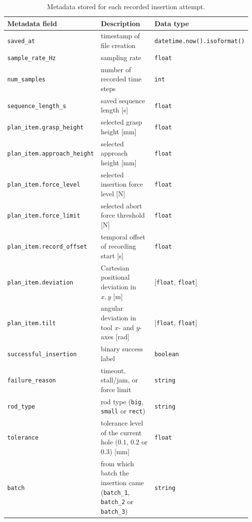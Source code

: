 \begin{table}[htbp]
    \centering
    \caption{Metadata stored for each recorded insertion attempt.}
    \label{tab:recorded_metadata}
    \begin{tabular}{lll}
        \hline
        Metadata field & Description & Data type \\
        \hline
        \texttt{saved\_at} & timestamp of file creation & \texttt{datetime.now().isoformat()} \\
        \texttt{sample\_rate\_Hz} & sampling rate & \texttt{float} \\
        \texttt{num\_samples} & number of recorded time steps & \texttt{int} \\
        \texttt{sequence\_length\_s} & saved sequence length [s] & \texttt{float} \\
        \hline
        \texttt{plan\_item.grasp\_height} & selected grasp height [mm] & \texttt{float} \\
        \texttt{plan\_item.approach\_height} & selected approach height [mm] & \texttt{float} \\
        \texttt{plan\_item.force\_level} & selected insertion force level [N] & \texttt{float} \\
        \texttt{plan\_item.force\_limit} & selected abort force threshold [N] & \texttt{float} \\
        \texttt{plan\_item.record\_offset} & temporal offset of recording start [s] & \texttt{float} \\
        \texttt{plan\_item.deviation} & Cartesian positional deviation in $x,y$ [m] & [\texttt{float}, \texttt{float}]  \\
        \texttt{plan\_item.tilt} & angular deviation in tool $x$- and $y$-axes [rad] & [\texttt{float}, \texttt{float}] \\
        \hline
        \texttt{successful\_insertion} & binary success label & \texttt{boolean} \\
        \texttt{failure\_reason} & timeout, stall/jam, or force limit & \texttt{string} \\
        \hline
        \texttt{rod\_type} & rod type (\texttt{big}, \texttt{small} or \texttt{rect}) & \texttt{string} \\
        \texttt{tolerance} & \makecell[l]{tolerance level of the current hole\\($0.1$, $0.2$ or $0.3$) [mm]} & \texttt{float} \\
        \texttt{batch} & \makecell[l]{from which batch the insertion came\\(\texttt{batch\_1}, \texttt{batch\_2} or \texttt{batch\_3})} & \texttt{string} \\

\end{tabular}
\end{table}
